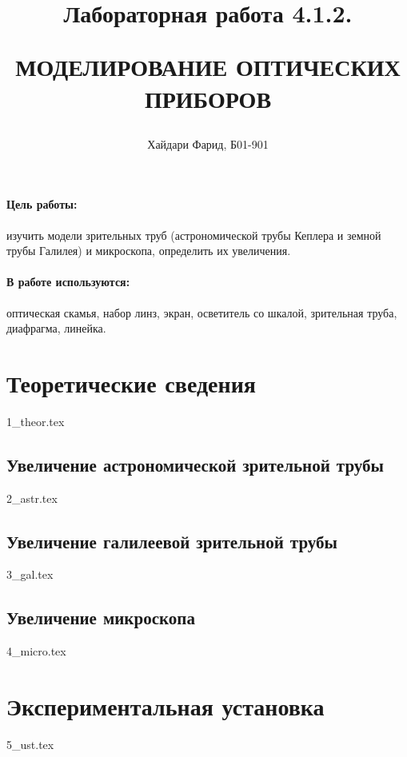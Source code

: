 \documentclass[a5paper,10pt, twoside]{article} %
\title
{
\hfill \break	\hfill \break
\hfill \break	\hfill \break
Лабораторная работа 4.1.2.

МОДЕЛИРОВАНИЕ ОПТИЧЕСКИХ ПРИБОРОВ
}
\author{Хайдари Фарид, Б01-901}
\begin{document}
\maketitle


\thispagestyle{empty} %

\newpage

\tableofcontents %
\thispagestyle{plain}
\newpage


\paragraph{Цель работы:}

изучить модели зрительных труб (астрономической трубы Кеплера и земной трубы Галилея) и микроскопа, 
определить их увеличения.

\paragraph{В работе используются:}

оптическая скамья, набор линз, экран, осветитель со шкалой, зрительная труба, диафрагма, линейка.

\section{Теоретические сведения}
{1_theor.tex}

  \subsection{Увеличение астрономической зрительной трубы}
  {2_astr.tex}

  \subsection{Увеличение галилеевой зрительной трубы}
  {3_gal.tex}

  \subsection{Увеличение микроскопа}
  {4_micro.tex}

\section{Экспериментальная установка}
{5_ust.tex}
\end{document}
